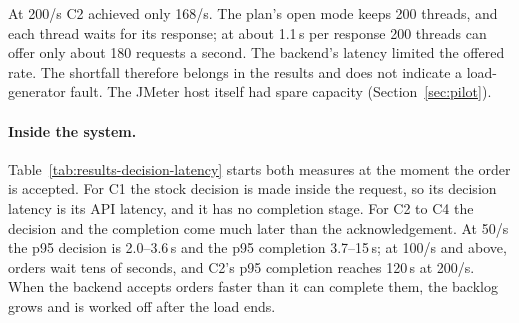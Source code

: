 \documentclass[a4paper]{report}
\begin{document}
At 200/s C2 achieved only 168/s. The plan's open mode keeps 200 threads, and
each thread waits for its response; at about 1.1\,s per response 200 threads
can offer only about 180 requests a second. The backend's latency limited the
offered rate. The shortfall therefore belongs in the results and does not
indicate a load-generator fault. The JMeter host itself had spare capacity
(Section~\ref{sec:pilot}).

\begin{table}[tbp]
\centering
\footnotesize
{}
\caption{Client-observed latency (ms) of order submissions (2xx only), from
the raw JTL, with the rate JMeter achieved (median). The maximum of every run
is in the per-run results table. Cells: median of 3 runs (range).}
\label{tab:results-api-latency}
\end{table}

\paragraph{Inside the system.} Table~\ref{tab:results-decision-latency}
starts both measures at the moment the order is accepted. For C1 the stock
decision is made inside the request, so its decision latency is its API
latency, and it has no completion stage. For C2 to C4 the decision and the
completion come much later than the acknowledgement. At 50/s the p95 decision
is 2.0--3.6\,s and the p95 completion 3.7--15\,s; at 100/s and above, orders
wait tens of seconds, and C2's p95 completion reaches 120\,s at 200/s. When
the backend accepts orders faster than it can complete them, the backlog grows
and is worked off after the load ends.

\begin{table}[tbp]
\centering
\scriptsize
\setlength{\tabcolsep}{4pt}
\caption{Stock-decision and completion latency (s), from the acceptance of
the order, per order from the stage timestamps. For C1 the decision is made
inside the request, so the decision values are its API latency and there is
no completion stage. Cells: median of 3 runs (range).}
\label{tab:results-decision-latency}
\end{table}
\end{document}
